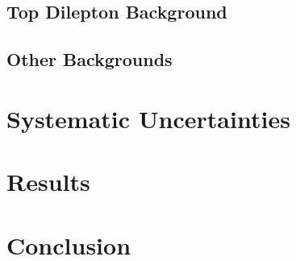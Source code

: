 \documentclass{cmspaper}
\begin{document}
  \subsection{Top Dilepton Background}
    \label{sec:bkg_dil}
    

  \subsection{Other Backgrounds}
    \label{sec:bkg_other}
%    


\section{Systematic Uncertainties}
  \label{sec:systematics}
   


\section{Results}
  \label{sec:results}
%  

\section{Conclusion}
    \label{sec:conclusion}
%    

\clearpage

\end{document}
